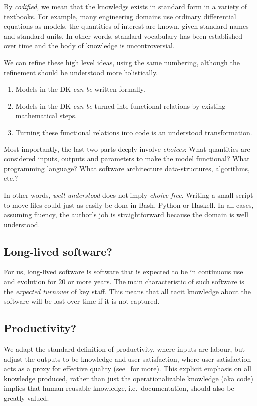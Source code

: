\documentclass[sigconf,review,anonymous=false]{acmart}
\begin{document}
By \emph{codified}, we mean that the knowledge exists in standard form in a
variety of textbooks. For example, many engineering domains use
ordinary differential equations as models, the quantities of
interest are known, given standard names and standard units. In other words,
standard vocabulary has been established over time and the body of knowledge is
uncontroversial.

We can refine these high level ideas, using the same numbering,
although the refinement should be
understood more holistically.
\begin{enumerate}
\item Models in the DK \emph{can be} written formally.
\item Models in the DK \emph{can be} turned into functional relations by
 existing mathematical steps.
\item Turning these functional relations into code is an understood
 transformation.
\end{enumerate}
Most importantly, the last two parts
deeply involve \emph{choices}: What quantities are considered inputs, outputs
and parameters to make the model functional? What programming language?  What
software architecture data-structures, algorithms, etc.?

In other words,
\emph{well understood} does not imply \emph{choice free}.  Writing a small 
script to move files could just as easily be done in Bash, Python or Haskell.
In all cases, assuming fluency, the author's job is straightforward because
the domain is well understood.

\subsection{Long-lived software?}
For us, long-lived software is software that is expected to be in continuous
use and evolution for $20$ or more years. The main characteristic of
such software is the \emph{expected turnover} of key staff. This means that
all tacit knowledge about the software will be lost over time if it is not
captured.

\subsection{Productivity?}
We adapt the standard definition of productivity, where inputs are labour,
but adjust the outputs to be knowledge and user satisfaction, where user
satisfaction acts as a proxy for effective quality
(see~\cite{SmithAndCarette2020arXiv} for more).
This explicit emphasis on all knowledge produced, rather than just the
operationalizable knowledge (aka code)
implies that human-reusable knowledge, i.e.\ documentation, should also be
greatly valued.
\end{document}

